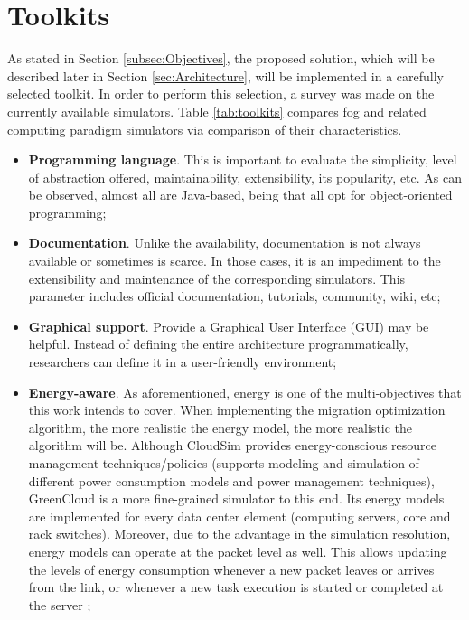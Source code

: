 \section{Toolkits}
\label{sec:Toolkits}
As stated in Section \ref{subsec:Objectives}, the proposed solution, which will be described later in Section \ref{sec:Architecture}, will be implemented in a carefully selected toolkit. In order to perform this selection, a survey was made on the currently available simulators. Table \ref{tab:toolkits} compares fog and related computing paradigm simulators via comparison of their characteristics.

\begin{itemize}[noitemsep]
\item \textbf{Programming language}. This is important to evaluate the simplicity, level of abstraction offered, maintainability, extensibility, its popularity, etc. As can be observed, almost all are Java-based, being that all opt for object-oriented programming;
\item \textbf{Documentation}. Unlike the availability, documentation is not always available or sometimes is scarce. In those cases, it is an impediment to the extensibility and maintenance of the corresponding simulators. This parameter includes official documentation, tutorials, community, wiki, etc;
\item \textbf{Graphical support}. Provide a Graphical User Interface (GUI) may be helpful. Instead of defining the entire architecture programmatically, researchers can define it in a user-friendly environment;
\item \textbf{Energy-aware}. As aforementioned, energy is one of the multi-objectives that this work intends to cover. When implementing the migration optimization algorithm, the more realistic the energy model, the more realistic the algorithm will be. Although CloudSim provides energy-conscious resource management techniques/policies (supports modeling and simulation of different power consumption models and power management techniques), GreenCloud is a more fine-grained simulator to this end. Its energy models are implemented for every data center element (computing servers, core and rack switches). Moreover, due to the advantage in the simulation resolution, energy models can operate at the packet level as well. This allows updating the levels of energy consumption whenever a new packet leaves or arrives from the link, or whenever a new task execution is started or completed at the server \cite{kliazovich2012greencloud};

\end{itemize}
